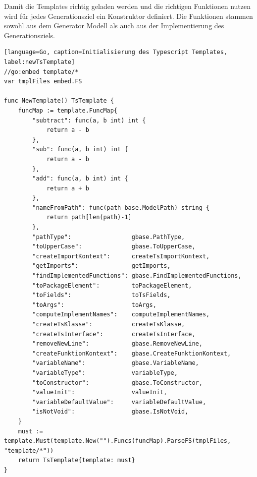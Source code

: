 \documentclass[./einleitung.tex]{subfiles}
\begin{document}
    Damit die Templates richtig geladen werden und die richtigen Funktionen nutzen wird für jedes Generationsziel ein Konstruktor definiert.
    Die Funktionen stammen sowohl aus dem Generator Modell als auch aus der Implementierung des Generationsziels.
    \begin{lstlisting}[language=Go, caption=Initialisierung des Typescript Templates, label:newTsTemplate]
//go:embed template/*
var tmplFiles embed.FS

func NewTemplate() TsTemplate {
	funcMap := template.FuncMap{
		"subtract": func(a, b int) int {
			return a - b
		},
		"sub": func(a, b int) int {
			return a - b
		},
		"add": func(a, b int) int {
			return a + b
		},
		"nameFromPath": func(path base.ModelPath) string {
			return path[len(path)-1]
		},
		"pathType":                 gbase.PathType,
		"toUpperCase":              gbase.ToUpperCase,
		"createImportKontext":      createTsImportKontext,
		"getImports":               getImports,
		"findImplementedFunctions": gbase.FindImplementedFunctions,
		"toPackageElement":         toPackageElement,
		"toFields":                 toTsFields,
		"toArgs":                   toArgs,
		"computeImplementNames":    computeImplementNames,
		"createTsKlasse":           createTsKlasse,
		"createTsInterface":        createTsInterface,
		"removeNewLine":            gbase.RemoveNewLine,
		"createFunktionKontext":    gbase.CreateFunktionKontext,
		"variableName":             gbase.VariableName,
		"variableType":             variableType,
		"toConstructor":            gbase.ToConstructor,
		"valueInit":                valueInit,
		"variableDefaultValue":     variableDefaultValue,
		"isNotVoid":                gbase.IsNotVoid,
	}
	must := template.Must(template.New("").Funcs(funcMap).ParseFS(tmplFiles, "template/*"))
	return TsTemplate{template: must}
}
    \end{lstlisting}
\end{document}
